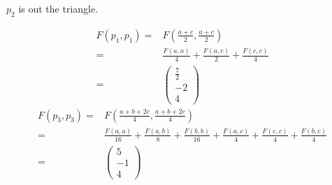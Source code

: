 \documentclass{article}
\begin{document}
	$p_2$ is out the triangle.
	
	\begin{equation*}
		\begin{aligned}
			F(p_1,p_1)=&F(\frac{a+c}{2},\frac{a+c}{2})\\
			=&\frac{F(a,a)}{4}+\frac{F(a,c)}{2}+\frac{F(c,c)}{4}\\
			=&\left(\begin{array}{c}	\frac{7}{2}\\-2\\4 \end{array}\right)
		\end{aligned}
	\end{equation*}
	\begin{equation*}
	\begin{aligned}
		F(p_3,p_3)=&F(\frac{a+b+2c}{4},\frac{a+b+2c}{4})\\
		=&\frac{F(a,a)}{16}+\frac{F(a,b)}{8}+\frac{F(b,b)}{16}+\frac{F(a,c)}{4}+\frac{F(c,c)}{4}+\frac{F(b,c)}{4}\\
		=&\left(\begin{array}{c}	5\\-1\\4 \end{array}\right)
	\end{aligned}
	\end{equation*}
\end{document}
